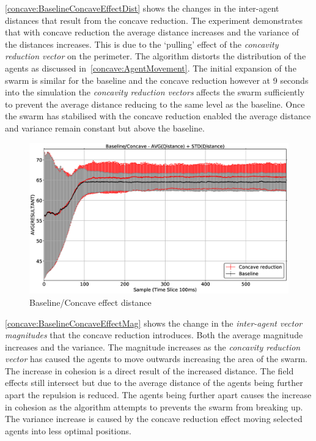 \autoref{concave:BaselineConcaveEffectDist} shows the changes in the inter-agent distances that result from the concave reduction. The experiment demonstrates that with concave reduction the average distance increases and the variance of the distances increases. This is due to the `pulling' effect of the \textit{concavity reduction vector} on the perimeter. The algorithm distorts the distribution of the agents as discussed in~\autoref{concave:AgentMovement}. The initial expansion of the swarm is similar for the baseline and the concave reduction however at 9 seconds into the simulation the \textit{concavity reduction vectors} affects the swarm sufficiently to prevent the average distance reducing to the same level as the baseline. Once the swarm has stabilised with the concave reduction enabled the average distance and variance remain constant but above the baseline.

\begin{figure}[H]
\begin{center}
\includegraphics[width=14cm]{CHAPTER-7/figures/BaselineConcaveEffectDist}
\end{center}
\caption{Baseline/Concave effect distance \label{concave:BaselineConcaveEffectDist}}
\end{figure}

\autoref{concave:BaselineConcaveEffectMag} shows the change in the \textit{inter-agent vector magnitudes} that the concave reduction introduces. Both the average magnitude increases and the variance. The magnitude increases as the \textit{concavity reduction vector} has caused the agents to move outwards increasing the area of the swarm. The increase in cohesion is a direct result of the increased distance. The field effects still intersect but due to the average distance of the agents being further apart the repulsion is reduced. The agents being further apart causes the increase in cohesion as the algorithm attempts to prevents the swarm from breaking up. The variance increase is caused by the concave reduction effect moving selected agents into less optimal positions.

